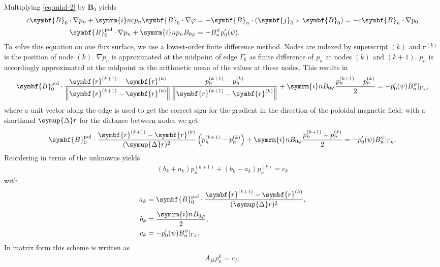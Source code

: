 \documentclass[a4paper, 10pt, english]{article}
\let\temp\vartheta
\let\vartheta\theta
\let\theta\temp
\let\temp\varphi
\let\varphi\phi
\let\phi\temp
\let\vec\symbf
\newcommand*\im{\ensuremath{\symrm{i}}}  %
\newcommand*\norm[1]{\ensuremath{\left \lVert #1 \right \rVert}}  %
\newcommand*\pol{\ensuremath{\textrm{pol}}}  %
\begin{document}
Multiplying \cref{eq:mhd-2} by $\vec{B}_{0}$ yields
\begin{align}
  c \vec{B}_{0} \cdot \nabla p_{n} + \im n c p_{n} \vec{B}_{0} \cdot \nabla \phi &= -\vec{B}_{n} \cdot (\vec{j}_{0} \times \vec{B}_{0}) = -c \vec{B}_{n} \cdot \nabla p_{0} \nonumber \\
  \vec{B}_{0}^{\pol} \cdot \nabla p_{n} + \im n p_{n} B_{0 \phi} &= -B_{n}^{\psi} p_{0}'(\psi).  \\
\end{align}
To solve this equation on one flux surface, we use a lowest-order finite difference method. Nodes are indexed by superscript $(k)$ and $\vec{r}^{(k)}$ is the position of node $(k)$. $\nabla p_{n}$ is approximated at the midpoint of edge $\Gamma_{k}$ as finite difference of $p_{n}$ at nodes $(k)$ and $(k+1)$. $p_{n}$ is accordingly approximated at the midpoint as the arithmetic mean of the values at these nodes. This results in
\begin{gather*}
  \vec{B}_{0}^{\pol} \cdot \frac{\vec{r}^{(k+1)} - \vec{r}^{(k)}}{\norm{\vec{r}^{(k+1)} - \vec{r}^{(k)}}} \frac{p_{n}^{(k+1)} - p_{n}^{(k)}}{\norm{\vec{r}^{(k+1)} - \vec{r}^{(k)}}} + \im n B_{0 \phi} \frac{p_{n}^{(k+1)} + p_{n}^{(k)}}{2} = -p_{0}'(\psi) B_{n}^{\psi} \vert_{\Gamma_{k}},
\end{gather*}
where a unit vector along the edge is used to get the correct sign for the gradient in the direction of the poloidal magnetic field; with a shorthand $\symup{\Delta} r$ for the distance between nodes we get
\begin{gather}
  \vec{B}_{0}^{\pol} \cdot \frac{\vec{r}^{(k+1)} - \vec{r}^{(k)}}{(\symup{\Delta} r)^2} \left ( p_{n}^{(k+1)} - p_{n}^{(k)} \right ) + \im n B_{0 \phi} \frac{p_{n}^{(k+1)} + p_{n}^{(k)}}{2} = -p_{0}'(\psi) B_{n}^{\psi} \vert_{\Gamma_{k}}.
\end{gather}
Reordering in terms of the unknowns yields
\begin{gather}
  (b_{k} + a_{k}) p_{n}^{(k+1)} + (b_{k} - a_{k}) p_{n}^{(k)} = c_{k}
\end{gather}
with
\begin{align}
  a_{k} &= \vec{B}_{0}^{\pol} \cdot \frac{\vec{r}^{(k+1)} - \vec{r}^{(k)}}{(\symup{\Delta} r)^2}, \\
  b_{k} &= \frac{\im n B_{0 \phi}}{2}, \\
  c_{k} &= -p_{0}'(\psi) B_{n}^{\psi} \vert_{\Gamma_{k}}.
\end{align}
In matrix form this scheme is written as
\begin{gather}
  A_{jk} p_{n}^{k} = c_{j},
\end{gather}
\end{document}
